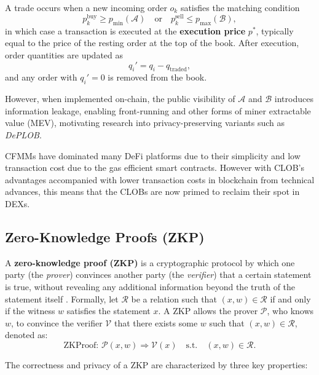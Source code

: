 \documentclass[12pt,a4paper]{article}
\begin{document}
A trade occurs when a new incoming order \(o_k\) satisfies the matching condition
$$
p_k^{\text{buy}} \geq p_{\min}(\mathcal{A}) \quad\text{or}\quad p_k^{\text{sell}} \leq p_{\max}(\mathcal{B}),
$$
in which case a transaction is executed at the \textbf{execution price} \(p^*\), typically equal to the price of the resting order at the top of the book. After execution, order quantities are updated as
$$
q_i' = q_i - q_{\text{traded}},
$$
and any order with \(q_i' = 0\) is removed from the book.

However, when implemented on-chain, the public visibility of \(\mathcal{A}\) and \(\mathcal{B}\) introduces information leakage, enabling front-running and other forms of miner extractable value (MEV), motivating research into privacy-preserving variants such as \textit{DePLOB}.

CFMMs have dominated many DeFi platforms due to their simplicity and low transaction cost due to the gas efficient smart contracts. However with CLOB's advantages accompanied with lower transaction costs in blockchain from technical advances, this means that the CLOBs are now primed to reclaim their spot in DEXs.

\subsection{Zero-Knowledge Proofs (ZKP)}

A \textbf{zero-knowledge proof (ZKP)} is a cryptographic protocol by which one party (the \textit{prover}) convinces another party (the \textit{verifier}) that a certain statement is true, without revealing any additional information beyond the truth of the statement itself \parencite{hasan2019overview}.  
Formally, let $\mathcal{R}$ be a relation such that $(x, w) \in \mathcal{R}$ if and only if the witness $w$ satisfies the statement $x$.  
A ZKP allows the prover $\mathcal{P}$, who knows $w$, to convince the verifier $\mathcal{V}$ that there exists some $w$ such that $(x, w) \in \mathcal{R}$, denoted as:
$$
\text{ZKProof: } \mathcal{P}(x, w) \Rightarrow \mathcal{V}(x) \quad \text{s.t.} \quad (x, w) \in \mathcal{R}.
$$

The correctness and privacy of a ZKP are characterized by three key properties:
\end{document}
